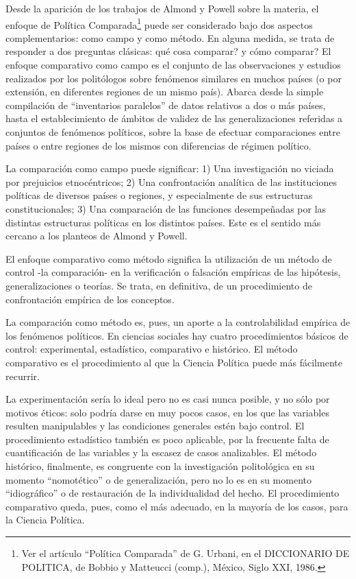 \documentclass[
]{book}
\begin{document}
Desde la aparición de los trabajos de Almond y Powell sobre la materia, el enfoque de Política Comparada\footnote{Ver el artículo ``Política Comparada'' de G. Urbani, en el DICCIONARIO DE POLITICA, de Bobbio y Matteucci (comp.), México, Siglo XXI, 1986.} puede ser considerado bajo dos aspectos complementarios: como campo y como método. En alguna medida, se trata de responder a dos preguntas clásicas: qué cosa comparar? y cómo comparar? El enfoque comparativo como campo es el conjunto de las observaciones y estudios realizados por los politólogos sobre fenómenos similares en muchos países (o por extensión, en diferentes regiones de un mismo país). Abarca desde la simple compilación de ``inventarios paralelos'' de datos relativos a dos o más países, hasta el establecimiento de ámbitos de validez de las generalizaciones referidas a conjuntos de fenómenos políticos, sobre la base de efectuar comparaciones entre países o entre regiones de los mismos con diferencias de régimen político.

La comparación como campo puede significar: 1) Una investigación no viciada por prejuicios etnocéntricos; 2) Una confrontación analítica de las instituciones políticas de diversos países o regiones, y especialmente de sus estructuras constitucionales; 3) Una comparación de las funciones desempeñadas por las distintas estructuras políticas en los distintos países. Este es el sentido más cercano a los planteos de Almond y Powell.

El enfoque comparativo como método significa la utilización de un método de control -la comparación- en la verificación o falsación empíricas de las hipótesis, generalizaciones o teorías. Se trata, en definitiva, de un procedimiento de confrontación empírica de los conceptos.

La comparación como método es, pues, un aporte a la controlabilidad empírica de los fenómenos políticos. En ciencias sociales hay cuatro procedimientos básicos de control: experimental, estadístico, comparativo e histórico. El método comparativo es el procedimiento al que la Ciencia Política puede más fácilmente recurrir.

La experimentación sería lo ideal pero no es casi nunca posible, y no sólo por motivos éticos: solo podría darse en muy pocos casos, en los que las variables resulten manipulables y las condiciones generales estén bajo control. El procedimiento estadístico también es poco aplicable, por la frecuente falta de cuantificación de las variables y la escasez de casos analizables. El método histórico, finalmente, es congruente con la investigación politológica en su momento ``nomotético'' o de generalización, pero no lo es en su momento ``idiográfico'' o de restauración de la individualidad del hecho. El procedimiento comparativo queda, pues, como el más adecuado, en la mayoría de los casos, para la Ciencia Política.
\end{document}
